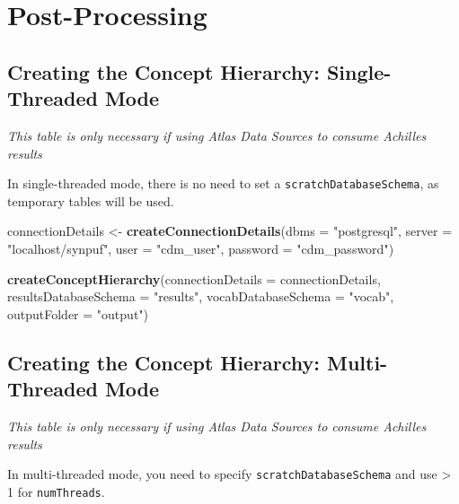 \documentclass[]{article}
\newenvironment{Shaded}{\begin{snugshade}}{\end{snugshade}}
\newcommand{\KeywordTok}[1]{\textcolor[rgb]{0.13,0.29,0.53}{\textbf{#1}}}
\newcommand{\DataTypeTok}[1]{\textcolor[rgb]{0.13,0.29,0.53}{#1}}
\newcommand{\StringTok}[1]{\textcolor[rgb]{0.31,0.60,0.02}{#1}}
\newcommand{\NormalTok}[1]{#1}
\begin{document}
\section{Post-Processing}\label{post-processing}

\subsection{Creating the Concept Hierarchy: Single-Threaded
Mode}\label{creating-the-concept-hierarchy-single-threaded-mode}

\emph{This table is only necessary if using Atlas Data Sources to
consume Achilles results}

In single-threaded mode, there is no need to set a
\texttt{scratchDatabaseSchema}, as temporary tables will be used.

\begin{Shaded}
\begin{Highlighting}[]
\NormalTok{connectionDetails <-}\StringTok{ }\KeywordTok{createConnectionDetails}\NormalTok{(}\DataTypeTok{dbms =} \StringTok{"postgresql"}\NormalTok{, }
                                             \DataTypeTok{server =} \StringTok{"localhost/synpuf"}\NormalTok{, }
                                             \DataTypeTok{user =} \StringTok{"cdm_user"}\NormalTok{, }
                                             \DataTypeTok{password =} \StringTok{"cdm_password"}\NormalTok{)}

\KeywordTok{createConceptHierarchy}\NormalTok{(}\DataTypeTok{connectionDetails =}\NormalTok{ connectionDetails, }
                       \DataTypeTok{resultsDatabaseSchema =} \StringTok{"results"}\NormalTok{, }
                       \DataTypeTok{vocabDatabaseSchema =} \StringTok{"vocab"}\NormalTok{, }
                       \DataTypeTok{outputFolder =} \StringTok{"output"}\NormalTok{)}
\end{Highlighting}
\end{Shaded}

\subsection{Creating the Concept Hierarchy: Multi-Threaded
Mode}\label{creating-the-concept-hierarchy-multi-threaded-mode}

\emph{This table is only necessary if using Atlas Data Sources to
consume Achilles results}

In multi-threaded mode, you need to specify
\texttt{scratchDatabaseSchema} and use \textgreater{} 1 for
\texttt{numThreads}.
\end{document}
